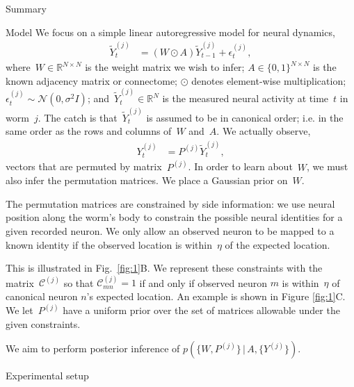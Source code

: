 \documentclass[final]{beamer}
\begin{document}
\begin{frame}[allowframebreaks]
\begin{minipage}[htp][1\textheight][t]{\textwidth}
\begin{columns}[t]
\begin{column}{.5\linewidth}
\begin{block}{Summary}
	 
	    \end{block}
	    
\begin{block}{Model}
We focus on a simple linear autoregressive
model for neural dynamics,
\begin{align}
  \widetilde{Y}_t^{(j)} &= (W \odot A) \widetilde{Y}_{t-1}^{(j)} + \epsilon_t^{(j)},
\end{align}
where~$W \in \mathbb{R}^{N \times N}$ is the weight matrix we wish to infer;
$A \in \{0,1\}^{N \times N}$ is the known adjacency matrix or connectome;
$\odot$ denotes element-wise multiplication;
$\epsilon_t^{(j)} \sim \mathcal{N}(0, \sigma^2 I)$;
and~$\widetilde{Y}_t^{(j)} \in \mathbb{R}^N$ is the measured neural activity
at time~$t$ in worm~$j$.  The catch is that~$\widetilde{Y}_t^{(j)}$ is
assumed to be in canonical order; i.e. in the same order as the rows and
columns of~$W$ and~$A$. We actually observe,
\begin{align}
  Y_t^{(j)} &= P^{(j)} \widetilde{Y}_t^{(j)},
\end{align}
vectors that are permuted by matrix~$P^{(j)}$. In order to learn about~$W$,
we must also infer the permutation matrices. We place a Gaussian prior on~$W$.

\vspace{0.5cm}
The permutation matrices are constrained by side
information: we use neural position along the worm's
body to constrain the possible neural identities for a given recorded
neuron. We only allow an observed neuron to be mapped to a known
identity if the observed location is within~$\eta$ of the expected
location.  

\vspace{0.5cm}
This is illustrated in Fig.~\ref{fig:1}B. We represent
these constraints with the matrix~$\mathcal{C}^{(j)}$ so that
$\mathcal{C}^{(j)}_{mn}=1$ if and only if observed neuron $m$ is
within~$\eta$ of canonical neuron $n$'s expected location.  An
example is shown in Figure \ref{fig:1}C. We let~$P^{(j)}$ have a
uniform prior over the set of matrices allowable under the given
constraints.

We aim to perform posterior inference of $p(\{W,P^{(j)}\} \, | \, A, \{Y^{(j)}\})$.
\end{block}

	 	             	    
\begin{block}{Experimental setup}


\end{block}
\end{column}
\end{columns}
\end{minipage}
\end{frame}
\end{document}
